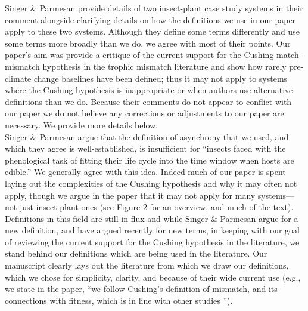 \documentclass[11pt,letter]{article}
\begin{document}

\renewcommand{\refname}{\CHead{}}

Singer \& Parmesan provide details of two insect-plant case study systems in their comment alongside clarifying details on how the definitions we use in our paper apply to these two systems. Although they define some terms differently and use some terms more broadly than we do, we agree with most of their points. Our paper's aim was provide a critique of the current support for the Cushing match-mismatch hypothesis in the trophic mismatch literature and show how rarely pre-climate change baselines have been defined; thus it may not apply to systems where the Cushing hypothesis is inappropriate or when authors use alternative definitions than we do. Because their comments do not appear to conflict with our paper we do not believe any corrections or adjustments to our paper are necessary.  We provide more details below.\\

Singer \& Parmesan argue that the definition of asynchrony that we used, and which they agree is well-established, is insufficient for ``insects faced with the phenological task of fitting their life cycle into the time window when hosts are edible.''  We generally agree with this idea. Indeed much of our paper is spent laying out the complexities of the Cushing hypothesis and why it may often not apply, though we argue in the paper that it may not apply for many systems---not just insect-plant ones (see Figure 2 for an overview, and much of the text). Definitions in this field are still in-flux and while Singer \& Parmesan argue for a new definition, and \citet{vissergienapp2019} have argued recently for new terms, in keeping with our goal of reviewing the current support for the Cushing hypothesis in the literature, we stand behind our definitions which are being used in the literature. Our manuscript clearly lays out the literature from which we draw our definitions, which we chose for simplicity, clarity, and because of their wide current use (e.g., we state in the paper, ``we follow Cushing's definition of mismatch, and its connections with fitness, which is in line with other studies \citep{Johansson2015,durant2007,kerby2012}''). \\
\end{document}
